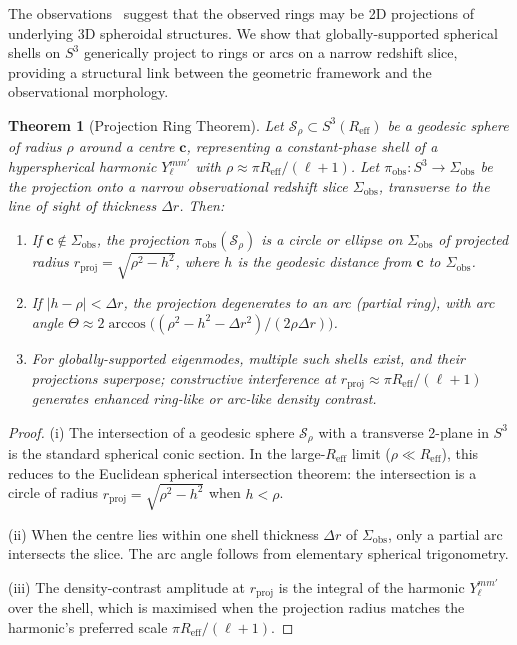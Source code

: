 \documentclass[
  aps,
  prd,
  reprint,
  superscriptaddress,
  nofootinbib,
  longbibliography,
  floatfix,
  amsmath,
  amssymb
]{revtex4-2}
\theoremstyle{plain}
\newtheorem{theorem}{Theorem}
\theoremstyle{definition}
\theoremstyle{remark}
\newcommand{\Sthree}{S^3}
\newcommand{\Reff}{R_{\mathrm{eff}}}
\begin{document}
The observations~\cite{Lopez2026} suggest that the observed rings may be
2D projections of underlying 3D spheroidal structures. We show that
globally-supported spherical shells on $\Sthree$ generically project
to rings or arcs on a narrow redshift slice, providing a structural
link between the geometric framework and the observational morphology.

\begin{theorem}[Projection Ring Theorem]
  \label{thm:projring}
  Let $\mathcal{S}_\rho\subset\Sthree(\Reff)$ be a geodesic sphere of
  radius $\rho$ around a centre $\mathbf{c}$, representing a constant-phase
  shell of a hyperspherical harmonic $Y_\ell^{mm'}$ with
  $\rho\approx \pi\Reff/(\ell+1)$. Let $\pi_{\mathrm{obs}}: \Sthree\to\Sigma_{\mathrm{obs}}$
  be the projection onto a narrow observational redshift slice
  $\Sigma_{\mathrm{obs}}$, transverse to the line of sight of thickness
  $\Delta r$. Then:
  \begin{enumerate}[label=\textup{(\roman*)}]
  \item If $\mathbf{c}\notin\Sigma_{\mathrm{obs}}$, the projection
    $\pi_{\mathrm{obs}}(\mathcal{S}_\rho)$ is a circle or ellipse
    on $\Sigma_{\mathrm{obs}}$ of projected radius
    $r_{\mathrm{proj}} = \sqrt{\rho^2 - h^2}$, where $h$ is the geodesic
    distance from $\mathbf{c}$ to $\Sigma_{\mathrm{obs}}$.
  \item If $|h-\rho|<\Delta r$, the projection degenerates to an
    arc (partial ring), with arc angle
    $\Theta\approx 2\arccos\bigl((\rho^2-h^2-\Delta r^2)/(2\rho\Delta r)\bigr)$.
  \item For globally-supported eigenmodes, multiple such shells exist,
    and their projections superpose; constructive interference at
    $r_{\mathrm{proj}} \approx \pi\Reff/(\ell+1)$ generates enhanced
    ring-like or arc-like density contrast.
  \end{enumerate}
\end{theorem}

\begin{proof}
  (i) The intersection of a geodesic sphere $\mathcal{S}_\rho$ with a
  transverse 2-plane in $\Sthree$ is the standard spherical conic
  section. In the large-$\Reff$ limit ($\rho\ll\Reff$), this reduces
  to the Euclidean spherical intersection theorem: the intersection
  is a circle of radius $r_{\mathrm{proj}}=\sqrt{\rho^2-h^2}$ when
  $h<\rho$.

  (ii) When the centre lies within one shell thickness $\Delta r$ of
  $\Sigma_{\mathrm{obs}}$, only a partial arc intersects the slice.
  The arc angle follows from elementary spherical trigonometry.

  (iii) The density-contrast amplitude at $r_{\mathrm{proj}}$ is the
  integral of the harmonic $Y_\ell^{mm'}$ over the shell, which is
  maximised when the projection radius matches the harmonic's preferred
  scale $\pi\Reff/(\ell+1)$.
\end{proof}
\end{document}
